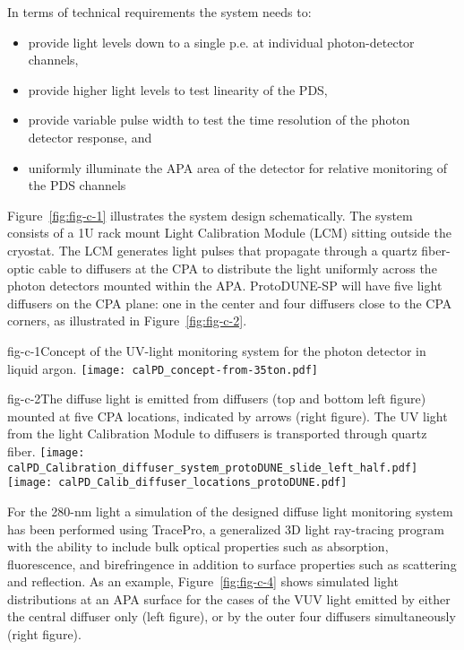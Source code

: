 In terms of technical requirements the system needs to:
\begin{itemize}
\item provide light levels down to a single p.e. at individual photon-detector channels,
\item provide higher light levels to test linearity of the PDS,
\item provide variable pulse width to test the time resolution of the photon detector response, and
\item uniformly illuminate the APA area of the detector for relative monitoring of the PDS channels
\end{itemize}

Figure~\ref{fig:fig-c-1} illustrates the system design schematically. The system consists of a 1U rack mount Light Calibration Module (LCM) sitting outside the cryostat. The LCM generates light pulses that propagate through a quartz fiber-optic cable to diffusers at the CPA to distribute the light uniformly across the photon detectors mounted within the APA.  ProtoDUNE-SP will have five light 
diffusers on the CPA plane: one in the center and four diffusers close to the CPA corners, as illustrated in Figure~\ref{fig:fig-c-2}. 
%
 \begin{cdrfigure}{fig-c-1}{Concept of the UV-light monitoring system for the photon detector in liquid argon.}
\texttt{[image: calPD\_concept-from-35ton.pdf]}
\end{cdrfigure}
%
%
\begin{cdrfigure}{fig-c-2}{The diffuse light is emitted from diffusers (top and bottom left figure) mounted at five CPA locations, indicated by arrows (right figure). 
The UV light from the light Calibration Module to diffusers is transported through quartz fiber.}
\texttt{[image: calPD\_Calibration\_diffuser\_system\_protoDUNE\_slide\_left\_half.pdf]}
\texttt{[image: calPD\_Calib\_diffuser\_locations\_protoDUNE.pdf]}
\end{cdrfigure}

%
%
For the 280-nm light a simulation of the designed diffuse light monitoring system has been performed using TracePro, a generalized 3D light ray-tracing program with the ability 
to include bulk optical properties such as absorption, fluorescence, and birefringence in addition to surface properties such as scattering and reflection. 
As an example, Figure~\ref{fig:fig-c-4} shows simulated light distributions at an APA surface for the cases of the VUV light emitted by either the central diffuser only (left figure), 
or by the outer four diffusers simultaneously (right figure). 

